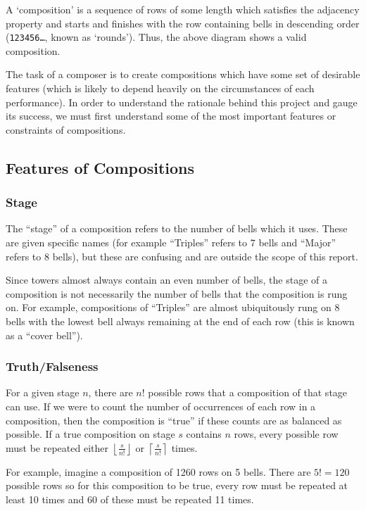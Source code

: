 \documentclass[12pt]{article}
\newcommand{\row}[1]{\texttt{#1}}
\begin{document}
A `composition' is a sequence of rows of some length which satisfies the adjacency property and
starts and finishes with the row containing bells in descending order (\row{123456\ldots}, known as
`rounds').  Thus, the above diagram shows a valid composition.

The task of a composer is to create compositions which have some set of desirable features (which is
likely to depend heavily on the circumstances of each performance).  In order to understand the
rationale behind this project and gauge its success, we must first understand some of the most
important features or constraints of compositions.

\subsection{Features of Compositions}

\subsubsection{Stage}

The ``stage'' of a composition refers to the number of bells which it uses.  These are given
specific names (for example ``Triples'' refers to 7 bells and ``Major'' refers to 8 bells), but
these are confusing and are outside the scope of this report.

Since towers almost always contain an even number of bells, the stage of a composition is not
necessarily the number of bells that the composition is rung on.  For example, compositions of
``Triples'' are almost ubiquitously rung on 8 bells with the lowest bell always remaining at the end
of each row (this is known as a ``cover bell'').

\subsubsection{Truth/Falseness}

For a given stage $n$, there are $n!$ possible rows that a composition of that stage can use.  If we
were to count the number of occurrences of each row in a composition, then the composition is
``true'' if these counts are as balanced as possible.  If a true composition on stage $s$ contains
$n$ rows, every possible row must be repeated either $\left\lfloor \frac{s}{n!} \right\rfloor$ or
$\left\lceil \frac{s}{n!} \right\rceil$ times.

For example, imagine a composition of 1260 rows on 5 bells.  There are $5! = 120$ possible rows so
for this composition to be true, every row must be repeated at least 10 times and 60 of these must
be repeated 11 times.
\end{document}
